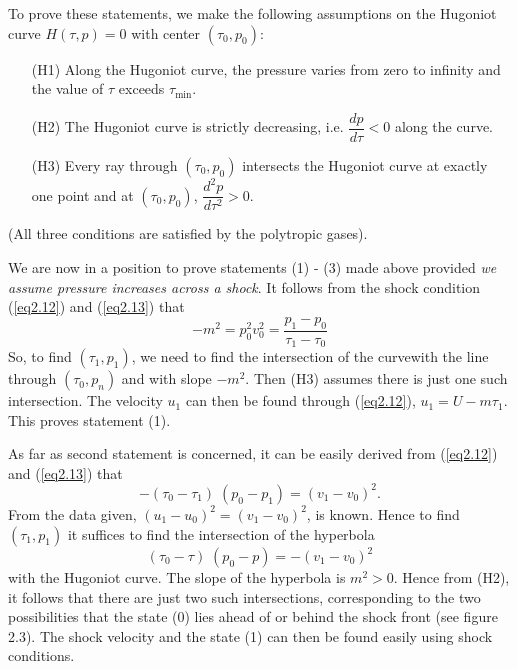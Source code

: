 To prove these statements, we make the following assumptions on the Hugoniot curve $H(\tau, p) = 0$ with center $(\tau_0, p_0)$:
\begin{itemize}
\item[{\rm (H1)}] Along the Hugoniot curve, the pressure varies from zero to infinity and the value of $\tau$ exceeds $\tau_{\min}$.

\item[{\rm (H2)}] The Hugoniot curve is strictly decreasing, i.e. $\dfrac{dp}{d\tau} < 0$ along the curve.

\item[{\rm (H3)}] Every ray through $(\tau_0, p_0)$ intersects the Hugoniot curve at exactly one point and at $(\tau_0, p_0)$, $\dfrac{d^2 p}{d\tau^2} >0$.
\end{itemize}

(All three conditions are satisfied by the polytropic gases).

We are now in a position to prove statements (1) - (3) made above provided {\em we assume pressure increases across a shock}. It follows from the shock condition (\ref{eq2.12}) and (\ref{eq2.13}) that 
\begin{equation*}
- m^2 = p^2_0 v^2_0 = \frac{p_1 - p_0}{\tau_1 - \tau_0}
\tag{2.25}\label{eq2.25}
\end{equation*}
So, to find $(\tau_1, p_1)$, we need to find the intersection of the curve\pageoriginale with the  line through $(\tau_0, p_n)$ and with slope $-m^2$. Then (H3) assumes there is just one such intersection. The velocity $u_1$ can then be found through (\ref{eq2.12}), $u_1 = U - m\tau_1$. This proves statement (1). 

As far as second statement is concerned, it can be easily derived from (\ref{eq2.12}) and (\ref{eq2.13}) that 
\begin{equation*}
-(\tau_0 - \tau_1) \; (p_0 - p_1) = (v_1 - v_0)^2. \tag{2.26}\label{eq2.26}
\end{equation*}
From the data given, $(u_1 - u_0)^2 = (v_1 - v_0)^2$, is known. Hence to find $(\tau_1, p_1)$ it suffices to find the intersection of the hyperbola
$$
(\tau_0 - \tau) \; (p_0 - p) = - (v_1 - v_0)^2
$$
with the Hugoniot curve. The slope of the hyperbola is $m^2 > 0$. Hence from (H2), it follows that there are just two such intersections, corresponding to the two possibilities that the state (0) lies ahead of or behind the shock front (see figure 2.3). The shock velocity and the state (1) can then be found easily using shock conditions. 

